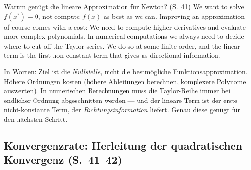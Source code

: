 \begin{satzbox}{Warum genügt die lineare Approximation für Newton? (S.~41)}
\glqq We want to solve $f(x^*) = 0$, not compute $f(x)$ as best as we can. Improving an approximation of course comes with a cost: We need to compute higher derivatives and evaluate more complex polynomials. In numerical computations we always need to decide where to cut off the Taylor series. We do so at some finite order, and the linear term is the first non-constant term that gives us directional information.\grqq{}

In Worten: Ziel ist die \emph{Nullstelle}, nicht die bestmögliche Funktionsapproximation. Höhere Ordnungen kosten (höhere Ableitungen berechnen, komplexere Polynome auswerten). In numerischen Berechnungen muss die Taylor-Reihe immer bei endlicher Ordnung abgeschnitten werden — und der lineare Term ist der erste nicht-konstante Term, der \emph{Richtungsinformation} liefert. Genau diese genügt für den nächsten Schritt.
\end{satzbox}

\subsection{Konvergenzrate: Herleitung der quadratischen Konvergenz (S.~41--42)}

